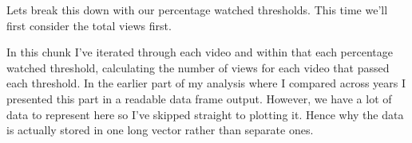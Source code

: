 \documentclass[
]{article}
\newenvironment{Shaded}{\begin{snugshade}}{\end{snugshade}}
\newcommand{\CommentTok}[1]{\textcolor[rgb]{0.56,0.35,0.01}{\textit{#1}}}
\newcommand{\ControlFlowTok}[1]{\textcolor[rgb]{0.13,0.29,0.53}{\textbf{#1}}}
\newcommand{\DecValTok}[1]{\textcolor[rgb]{0.00,0.00,0.81}{#1}}
\newcommand{\KeywordTok}[1]{\textcolor[rgb]{0.13,0.29,0.53}{\textbf{#1}}}
\newcommand{\NormalTok}[1]{#1}
\newcommand{\OperatorTok}[1]{\textcolor[rgb]{0.81,0.36,0.00}{\textbf{#1}}}
\newcommand{\OtherTok}[1]{\textcolor[rgb]{0.56,0.35,0.01}{#1}}
\newcommand{\StringTok}[1]{\textcolor[rgb]{0.31,0.60,0.02}{#1}}
\begin{document}
Lets break this down with our percentage watched thresholds. This time
we'll first consider the total views first.

\begin{Shaded}
\end{Shaded}

In this chunk I've iterated through each video and within that each
percentage watched threshold, calculating the number of views for each
video that passed each threshold. In the earlier part of my analysis
where I compared across years I presented this part in a readable data
frame output. However, we have a lot of data to represent here so I've
skipped straight to plotting it. Hence why the data is actually stored
in one long vector rather than separate ones.
\end{document}
